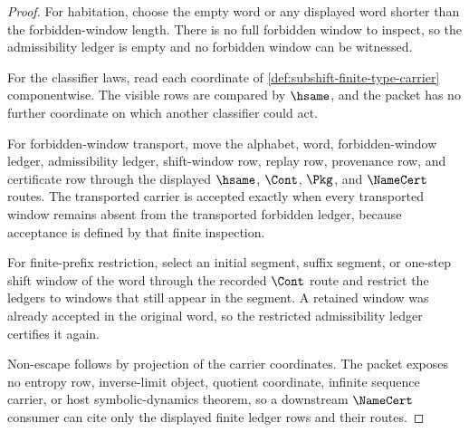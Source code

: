 \begin{proof}
For habitation, choose the empty word or any displayed word shorter than the forbidden-window length. There is no full forbidden window to inspect, so the admissibility ledger is empty and no forbidden window can be witnessed.

For the classifier laws, read each coordinate of \autoref{def:subshift-finite-type-carrier} componentwise. The visible rows are compared by $\hsame$, and the packet has no further coordinate on which another classifier could act.

For forbidden-window transport, move the alphabet, word, forbidden-window ledger, admissibility ledger, shift-window row, replay row, provenance row, and certificate row through the displayed $\hsame$, $\Cont$, $\Pkg$, and $\NameCert$ routes. The transported carrier is accepted exactly when every transported window remains absent from the transported forbidden ledger, because acceptance is defined by that finite inspection.

For finite-prefix restriction, select an initial segment, suffix segment, or one-step shift window of the word through the recorded $\Cont$ route and restrict the ledgers to windows that still appear in the segment. A retained window was already accepted in the original word, so the restricted admissibility ledger certifies it again.

Non-escape follows by projection of the carrier coordinates. The packet exposes no entropy row, inverse-limit object, quotient coordinate, infinite sequence carrier, or host symbolic-dynamics theorem, so a downstream $\NameCert$ consumer can cite only the displayed finite ledger rows and their routes.
\end{proof}

